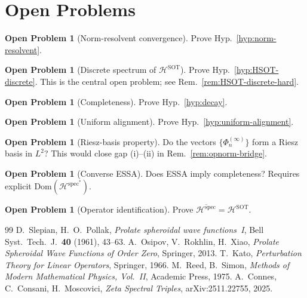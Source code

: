 \documentclass[12pt,a4paper]{amsart}
\theoremstyle{definition}
\newtheorem{problem}[theorem]{Open Problem}
\theoremstyle{remark}
\newcommand{\Hspec}{\mathcal{H}^{\mathrm{spec}}}
\newcommand{\HSOT}{\mathcal{H}^{\mathrm{SOT}}}
\newcommand{\Dom}{\mathrm{Dom}}
\begin{document}
\section{Open Problems}
\label{sec:problems}

\begin{problem}[Norm-resolvent convergence]
\label{prob:norm-resolvent}
Prove Hyp.~\ref{hyp:norm-resolvent}.
\end{problem}

\begin{problem}[Discrete spectrum of $\HSOT$]
\label{prob:HSOT-discrete}
Prove Hyp.~\ref{hyp:HSOT-discrete}.
This is the central open problem;
see Rem.~\ref{rem:HSOT-discrete-hard}.
\end{problem}

\begin{problem}[Completeness]
\label{prob:completeness}
Prove Hyp.~\ref{hyp:decay}.
\end{problem}

\begin{problem}[Uniform alignment]
\label{prob:uniform-alignment}
Prove Hyp.~\ref{hyp:uniform-alignment}.
\end{problem}

\begin{problem}[Riesz-basis property]
\label{prob:riesz}
Do the vectors $\{\Phi_n^{(\infty)}\}$ form a Riesz
basis in $L^2$?
This would close gap (i)--(ii) in
Rem.~\ref{rem:opnorm-bridge}.
\end{problem}

\begin{problem}[Converse ESSA]
\label{prob:essa-converse}
Does ESSA imply completeness?
Requires explicit $\Dom(\Hspec^*)$.
\end{problem}

\begin{problem}[Operator identification]
\label{prob:identification}
Prove $\overline{\Hspec}=\HSOT$.
\end{problem}

\begin{thebibliography}{99}
  D.~Slepian, H.~O.~Pollak,
  \textit{Prolate spheroidal wave functions~I},
  Bell Syst.\ Tech.\ J.\ \textbf{40} (1961), 43--63.
  A.~Osipov, V.~Rokhlin, H.~Xiao,
  \textit{Prolate Spheroidal Wave Functions of Order Zero},
  Springer, 2013.
  T.~Kato,
  \textit{Perturbation Theory for Linear Operators},
  Springer, 1966.
  M.~Reed, B.~Simon,
  \textit{Methods of Modern Mathematical Physics, Vol.~II},
  Academic Press, 1975.
  A.~Connes, C.~Consani, H.~Moscovici,
  \textit{Zeta Spectral Triples}, arXiv:2511.22755, 2025.
\end{thebibliography}
\end{document}
